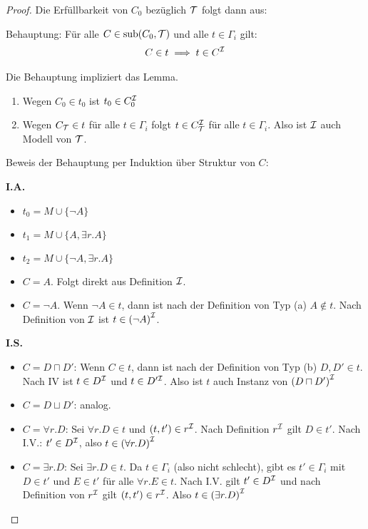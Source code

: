 \begin{proof}
Die Erfüllbarkeit von $C_0$ bezüglich $\mathcal{T}$ folgt dann aus:

Behauptung: Für alle $C \in \operatorname{sub}(C_0, \mathcal{T})$ und alle $t \in \Gamma_i$ gilt:
\begin{align*}
    C \in t \implies t \in C^{\mathcal{I}}
\end{align*}

\begin{tafel}[name=Beweis der Behauptung, continues=t:example51]
    Die Behauptung impliziert das Lemma.
    \begin{enumerate}
        \item Wegen $C_0 \in t_0$ ist $t_0 \in C_0^{\mathcal{I}}$
        \item Wegen $C_{\mathcal{T}} \in t$ für alle $t \in \Gamma_i$ folgt $t \in C_{\mathcal{T}}^{\mathcal{I}}$ für alle $t \in \Gamma_i$. Also ist $\mathcal{I}$ auch Modell von $\mathcal{T}$.
    \end{enumerate}
    Beweis der Behauptung per Induktion über Struktur von $C$:

\textbf{I.A.}
\begin{itemize}
  \item $t_0 = M \cup \{\neg A\}$
  \item $t_1 = M \cup \{A,\exists r.A\}$
  \item $t_2 = M \cup \{\neg A,\exists r.A\}$
    \item $C = A$. Folgt direkt aus Definition $\mathcal{I}$.
    \item $C = \neg A$. Wenn $\neg A \in t$, dann ist nach der Definition von Typ (a) $A \notin t$. Nach Definition von $\mathcal{I}$ ist $t \in {(\neg A)}^{\mathcal{I}}$.
\end{itemize}
\textbf{I.S.}
\begin{itemize}
    \item $C = D \sqcap D'$: Wenn $C \in t$, dann ist nach der Definition von  Typ (b) $D, D' \in t$. Nach IV ist $t \in D^{\mathcal{I}}$ und $t \in D'^{\mathcal{I}}$. Also ist $t$ auch Instanz von ${(D \sqcap D')}^{\mathcal{I}}$
    \item $C = D \sqcup D'$: analog.

\item $C = \forall r.D$:
Sei $\forall r.D \in t$ und $\left( t,t' \right) \in r^\MI$. Nach
Definition $r^{\mathcal{I}}$ gilt $D \in t'$. Nach I.V.:
$t' \in D^{\mathcal{I}}$, also $t \in {( \forall r.D )}^{\mathcal{I}}$

\item $C = \exists r.D$:
Sei $\exists r.D \in t$. Da $t \in \Gamma_{i}$ (also nicht
schlecht), gibt es $t' \in \Gamma_{i}$ mit $D \in t'$ und
$E \in t'$ für alle $\forall r.E \in t$. Nach I.V. gilt
$t' \in D^{\mathcal{I}}$ und nach Definition von $r^{\mathcal{I}}$ gilt
$\left( t,t' \right) \in r^\MI$. Also
$t \in {(\exists r.D )}^{\mathcal{I}}$
\end{itemize}
\end{tafel}
\end{proof}


